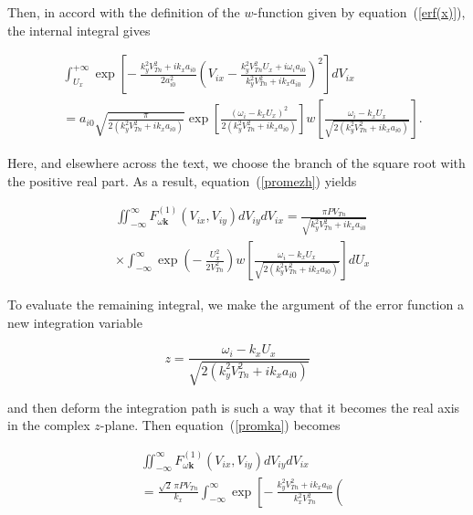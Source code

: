 \documentclass[draft]{agujournal2019}
\renewcommand{\vec}{\mathbf}
\begin{document}
{\begin{linenomath*}
\end{linenomath*}
Then, in accord with the definition of the $w$-function given by
equation~(\ref{erf(x)}), the internal integral gives
\begin{linenomath*}
\begin{align*}
&  \int_{U_{x}}^{+\infty}\exp\left[  -\ \frac{k_{y}^{2}V_{Tn}^{2}+ik_{x}%
a_{i0}}{2a_{i0}^{2}}\left(  V_{ix}-\frac{k_{y}^{2}V_{Tn}^{2}U_{x}+i\omega
_{i}a_{i0}}{k_{y}^{2}V_{Tn}^{2}+ik_{x}a_{i0}}\right)  ^{2}\right]  dV_{ix}\\
&  =a_{i0}\sqrt{\frac{\pi}{2(k_{y}^{2}V_{Tn}^{2}+ik_{x}a_{i0})}}\exp\left[
\frac{\left(\omega_{i}-k_{x}U_{x}\right)  ^{2}}{2(k_{y}^{2}V_{Tn}^{2}%
+ik_{x}a_{i0})}\right]  w\left[  \frac{\omega_{i}-k_{x}U_{x}}{\sqrt{2(k_{y}%
^{2}V_{Tn}^{2}+ik_{x}a_{i0})}}\right].
\end{align*}
\end{linenomath*}
Here, and elsewhere across the text, we choose the branch of the square
root with the positive real part. As a result, equation~(\ref{promezh}) yields
\begin{linenomath*}
\begin{align}
&  \iint_{-\infty}^{\infty}F_{\omega\vec{k}}^{(1)}(V_{ix},V_{iy}%
)dV_{iy}dV_{ix}=\frac{\pi PV_{Tn}}{\sqrt{k_{y}^{2}V_{Tn}^{2}+ik_{x}a_{i0}}%
}\nonumber\\
&  \times\int_{-\infty}^{\infty}\exp\left(  -\ \frac{U_{x}^{2}}{2V_{Tn}^{2}%
}\right)  w\left[  \frac{\omega_{i}-k_{x}U_{x}}{\sqrt{2(k_{y}^{2}V_{Tn}%
^{2}+ik_{x}a_{i0})}}\right]  dU_{x} 
\label{promka}
\end{align}
\end{linenomath*}
To evaluate the remaining integral, we make the argument of the error function
a new integration variable
\begin{linenomath*}
\begin{equation}
z=\frac{\omega_{i}-k_{x}U_{x}}{\sqrt{2(k_{y}^{2}V_{Tn}^{2}+ik_{x}a_{i0})}}
\label{z}
\end{equation}
\end{linenomath*}
and then deform the integration path is such a way that it becomes the real
axis in the complex $z$-plane. Then equation~(\ref{promka}) becomes
\begin{linenomath*}
\begin{align}
&  \iint_{-\infty}^{\infty}F_{\omega\vec{k}}^{(1)}(V_{ix},V_{iy}%
)dV_{iy}dV_{ix}\nonumber\\
&  =\frac{\sqrt{2}\,\pi PV_{Tn}}{k_{x}}\int_{-\infty}^{\infty}\exp\left[
-\ \frac{k_{y}^{2}V_{Tn}^{2}+ik_{x}a_{i0}}{k_{x}^{2}V_{Tn}^{2}}\left(

\end{align}
\end{linenomath*}}
\end{document}
